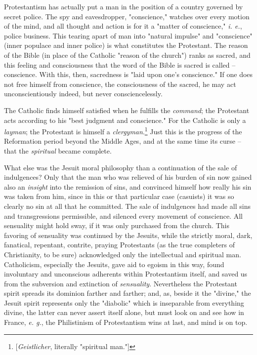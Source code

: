 \documentclass[a4paper]{book}
\begin{document}
Protestantism has actually put a man in the position of a country governed by 
secret police. The spy and eavesdropper, "{}conscience,"{} watches over every 
motion of the mind, and all thought and action is for it a "{}matter of 
conscience,"{} \textit{i. e.}, police business. This tearing apart of man into 
"{}natural impulse"{} and "{}conscience"{} (inner populace and inner police) 
is what constitutes the Protestant. The reason of the Bible (in place of the 
Catholic "{}reason of the church"{}) ranks as sacred, and this feeling and 
consciousness that the word of the Bible is sacred is called -- conscience. 
With this, then, sacredness is "{}laid upon one's conscience."{} If one does 
not free himself from conscience, the consciousness of the sacred, he may act 
unconscientiously indeed, but never consciencelessly.

The Catholic finds himself satisfied when he fulfills the \textit{command}; 
the Protestant acts according to his "{}best judgment and conscience."{} For 
the Catholic is only a \textit{layman}; the Protestant is himself a 
\textit{clergyman}.\footnote{[\textit{Geistlicher}, literally "{}spiritual 
man."{}]} Just this is the progress of the Reformation period beyond the 
Middle Ages, and at the same time its curse -- that the \textit{spiritual} 
became complete.

What else was the Jesuit moral philosophy than a continuation of the sale of 
indulgences? Only that the man who was relieved of his burden of sin now 
gained also an \textit{insight} into the remission of sins, and convinced 
himself how really his sin was taken from him, since in this or that 
particular case (casuists) it was so clearly no sin at all that he committed. 
The sale of indulgences had made all sins and transgressions permissible, and 
silenced every movement of conscience. All sensuality might hold sway, if it 
was only purchased from the church. This favoring of sensuality was continued 
by the Jesuits, while the strictly moral, dark, fanatical, repentant, 
contrite, praying Protestants (as the true completers of Christianity, to be 
sure) acknowledged only the intellectual and spiritual man. Catholicism, 
especially the Jesuits, gave aid to egoism in this way, found involuntary and 
unconscious adherents within Protestantism itself, and saved us from the 
subversion and extinction of \textit{sensuality}. Nevertheless the Protestant 
spirit spreads its dominion farther and farther; and, as, beside it the 
"{}divine,"{} the Jesuit spirit represents only the "{}diabolic"{} which is 
inseparable from everything divine, the latter can never assert itself alone, 
but must look on and see how in France, \textit{e. g.}, the Philistinism of 
Protestantism wins at last, and mind is on top.
\end{document}
